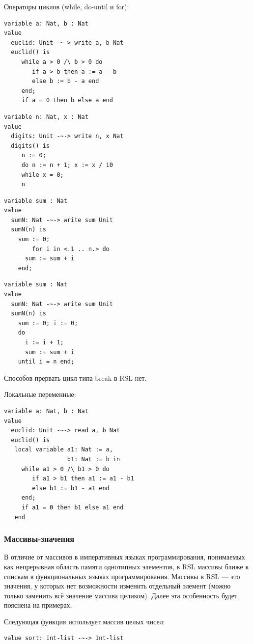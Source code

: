 \documentclass[14pt, twoside]{extreport}
\newcommand{\head}[1]{\vspace{1cm}\subsubsection*{#1}}
\begin{document}
Операторы циклов (while, do-until и for):

\begin{lstlisting}
variable a: Nat, b : Nat
value
  euclid: Unit -~-> write a, b Nat
  euclid() is
     while a > 0 /\ b > 0 do
        if a > b then a := a - b
        else b := b - a end
     end;
     if a = 0 then b else a end
\end{lstlisting}

\begin{lstlisting}
variable n: Nat, x : Nat
value
  digits: Unit -~-> write n, x Nat
  digits() is
     n := 0;
     do n := n + 1; x := x / 10
     while x = 0;
     n
\end{lstlisting}

\begin{lstlisting}
variable sum : Nat
value
  sumN: Nat -~-> write sum Unit
  sumN(n) is
	sum := 0;
        for i in <.1 .. n.> do
	  sum := sum + i
	end;
\end{lstlisting}

\begin{lstlisting}
variable sum : Nat
value
  sumN: Nat -~-> write sum Unit
  sumN(n) is
	sum := 0; i := 0;
    do
      i := i + 1;
      sum := sum + i
    until i = n	end;
\end{lstlisting}

Способов прервать цикл типа break в RSL нет.

Локальные переменные:
\begin{lstlisting}
variable a: Nat, b : Nat
value
  euclid: Unit -~-> read a, b Nat
  euclid() is
   local variable a1: Nat := a,
                  b1: Nat := b in
     while a1 > 0 /\ b1 > 0 do
        if a1 > b1 then a1 := a1 - b1
        else b1 := b1 - a1 end
     end;
     if a1 = 0 then b1 else a1 end
   end
\end{lstlisting}


\head{Массивы-значения}
В отличие от массивов в императивных языках программирования, понимаемых как непрерывная область памяти однотипных элементов, в RSL массивы ближе к спискам в функциональных языках программирования. Массивы в RSL --- это значения, у которых нет возможности изменить отдельный элемент (можно только заменить всё значение массива целиком). Далее эта особенность будет пояснена на примерах.

Следующая функция использует массив целых чисел:
\begin{lstlisting}
value sort: Int-list -~-> Int-list
\end{lstlisting}
\end{document}
